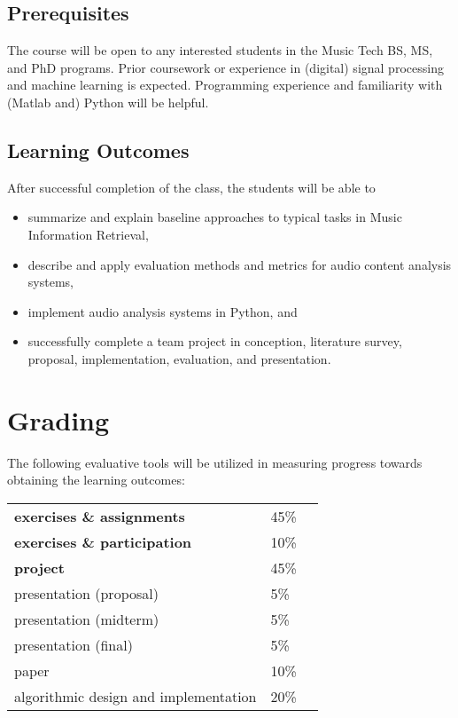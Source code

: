 \documentclass[letterpaper,oneside,10pt]{scrartcl}
\begin{document}
    \subsection{Prerequisites}
        The course will be open to any interested students in the Music Tech BS, MS, and PhD programs. Prior coursework or experience in (digital) signal processing and machine learning is expected. Programming experience and familiarity with (Matlab and) Python will be helpful. 

    \subsection{Learning Outcomes}        
        After successful completion of the class, the students will be able to 
        \begin{itemize}
            \item   summarize and explain baseline approaches to typical tasks in Music Information Retrieval,
            \item   describe and apply evaluation methods and metrics for audio content analysis systems,
            \item   implement audio analysis systems in Python, and
            \item   successfully complete a team project in conception, literature survey, proposal, implementation, evaluation, and presentation.
        \end{itemize}

\section{Grading}
    The following evaluative tools will be utilized in measuring progress towards obtaining the learning outcomes:
    \smallskip
    
    \begin{tabular}{lll}
        \textbf{exercises \& assignments} & 45\%\\
        \textbf{exercises \& participation} & 10\%\\
        \textbf{project} & 45\% \\
        \quad presentation (proposal) & 5\%\\
        \quad presentation (midterm) & 5\%\\
        \quad presentation (final) & 5\%\\
        \quad paper & 10\%\\
        \quad algorithmic design and implementation & 20\%\\
    \end{tabular}
    
\end{document}
